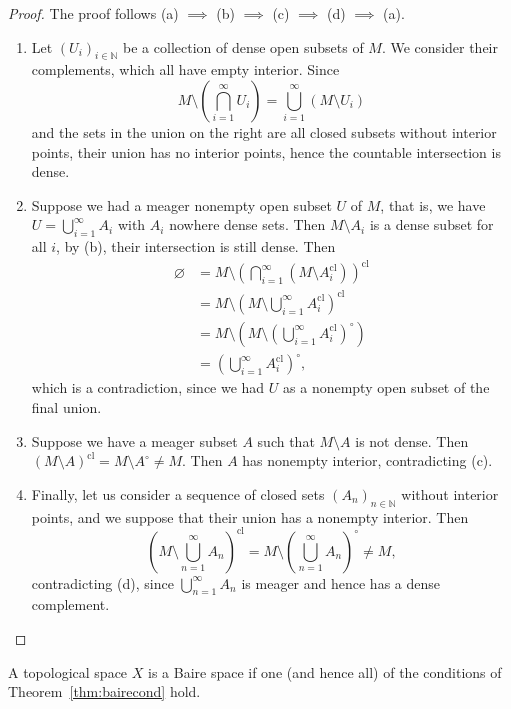 \documentclass[prb,12pt]{revtex4-2}
\theoremstyle{definition}
\theoremstyle{definition}
\theoremstyle{definition}
\newcommand{\N}{\mathbb{N}}
\begin{document}
\begin{proof}
	The proof follows (a) $\implies$ (b) $\implies$ (c) $\implies$ (d) $\implies$ (a).
	\begin{enumerate}
		\item Let $(U_i)_{i\in \N}$ be a collection of dense open subsets of $M$. We consider their complements, which all have empty interior. Since
		\[M \setminus \left(\bigcap_{i=1}^\infty U_i\right)=\bigcup_{i=1}^\infty \left(M \setminus U_i\right)\]
		and the sets in the union on the right are all closed subsets without interior points, their union has no interior points, hence the countable intersection is dense.
		\item Suppose we had a meager nonempty open subset $U$ of $M$, that is, we have $U=\bigcup_{i=1}^\infty A_i$ with $A_i$ nowhere dense sets. Then $M \setminus A_i$ is a dense subset for all $i$, by (b), their intersection is still dense. Then
		\begin{align*}
			\varnothing &= M \setminus \left(\bigcap_{i=1}^\infty (M \setminus A_i^\text{cl})\right)^\text{cl}\\
			&= M \setminus \left(M \setminus \bigcup_{i=1}^\infty A_i^\text{cl}\right)^\text{cl}\\
			&= M \setminus \left(M \setminus\left(\bigcup_{i=1}^\infty A_i^\text{cl}\right)^\circ\right)\\
			&=\left(\bigcup_{i=1}^\infty A_i^\text{cl}\right)^\circ,
		\end{align*}
	which is a contradiction, since we had $U$ as a nonempty open subset of the final union. 
	\item Suppose we have a meager subset $A$ such that $M\setminus A$ is not dense. Then $(M \setminus A)^\text{cl} = M \setminus A^\circ \neq M$. Then $A$ has nonempty interior, contradicting (c).
	\item Finally, let us consider a sequence of closed sets $(A_n)_{n\in \N}$ without interior points, and we suppose that their union has a nonempty interior. Then
	\[\left(M \setminus \bigcup_{n=1}^\infty A_n\right)^\text{cl}=M \setminus \left(\bigcup_{n=1}^\infty A_n\right)^\circ\neq M,\]
	contradicting (d), since $\bigcup_{n=1}^\infty A_n$ is meager and hence has a dense complement.\qedhere
	\end{enumerate}
\end{proof}
	\begin{Definition}
		A topological space $X$ is a Baire space if one (and hence all) of the conditions of Theorem~\ref{thm:bairecond} hold.
	\end{Definition}
\end{document}
